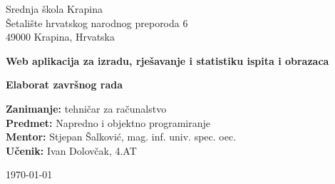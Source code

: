 \begin{titlepage}
    \begin{flushleft}
        Srednja škola Krapina\\
        Šetalište hrvatskog narodnog preporoda 6\\
        49000 Krapina, Hrvatska\\
    \end{flushleft}

    \vfill

    \begin{center}
        \LARGE
        \textbf{
            Web aplikacija za izradu, rješavanje i statistiku ispita i obrazaca}\\

        \vspace{0.5cm}

        \Large
        \textcolor{\accentColor}{\textbf{Elaborat završnog rada}}\\

    \end{center}

    \vfill

    \begin{flushleft}
        \normalsize
        \textbf{Zanimanje:} tehničar za računalstvo\\
        \textbf{Predmet:} Napredno i objektno programiranje\\
        \textbf{Mentor:} Stjepan Šalković, mag. inf. univ. spec. oec.\\
        \textbf{Učenik:} Ivan Dolovčak, 4.AT\\
    \end{flushleft}

    \vspace{1cm}

    \begin{center}
        \today
    \end{center}
\end{titlepage}
